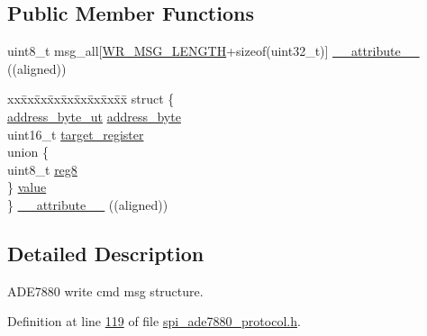 \subsection*{Public Member Functions}
\begin{DoxyCompactItemize}
\item 
uint8\-\_\-t msg\-\_\-all\mbox{[}\hyperlink{a00041_ac85ecf34a5cbd85d6dbd51b4c9a5469e}{W\-R\-\_\-\-M\-S\-G\-\_\-\-L\-E\-N\-G\-T\-H}+sizeof(uint32\-\_\-t)\mbox{]} \hyperlink{a00019_a1649e1bd9e3b85107dbd32225b489e11}{\-\_\-\-\_\-attribute\-\_\-\-\_\-} ((aligned))
\item 
\begin{tabbing}
xx\=xx\=xx\=xx\=xx\=xx\=xx\=xx\=xx\=\kill
struct \{\\
\>\hyperlink{a00011}{address\_byte\_ut} \hyperlink{a00019_af6a65bac733ea3e9b1d24b065163d49a}{address\_byte}\\
\>uint16\_t \hyperlink{a00019_ac02048009fa6718e40f028b6bae63f3d}{target\_register}\\
\>union \{\\
\>\>uint8\_t \hyperlink{a00019_a90b3f782e917edca7101e7803a3773b7}{reg8}\\
\>\} \hyperlink{a00019_ab4f46e86bbd7d1190771b4881384d603}{value}\\
\} \hyperlink{a00019_a2933db9f26f9a2faa2a0ef950dea283e}{\_\_attribute\_\_} ((aligned))\\

\end{tabbing}\end{DoxyCompactItemize}


\subsection{Detailed Description}
A\-D\-E7880 write cmd msg structure. 

Definition at line \hyperlink{a00041_source_l00119}{119} of file \hyperlink{a00041_source}{spi\-\_\-ade7880\-\_\-protocol.\-h}.



